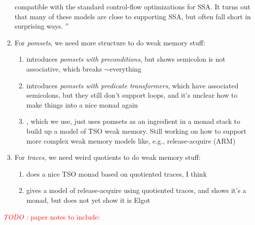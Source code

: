 \documentclass[acmsmall,screen,review]{acmart}
\newcounter{todos}
\newcommand{\TODO}[1]{{
  \stepcounter{todos}
  \begin{center}\large{\textcolor{red}{\emph{TODO \arabic{todos}:} #1}}\end{center}
}}
\begin{document}
\begin{enumerate}
  compatible with the standard control-flow optimizations for SSA. It turns out that many of these
  models are close to supporting SSA, but often fall short in surprising ways. 
  ''
  \item For \emph{pomsets}, we need more structure to do weak memory stuff:
  \begin{enumerate}
    \item \citet{jagadeesan-pwp-20} introduces \emph{pomsets with preconditions}, but
    \citet{leaky-semicolon} shows semicolon is not associative, which breaks $\sim$everything
    \item \citet{leaky-semicolon} introduces \emph{pomsets with predicate transformers}, which have
    associated semicolons, but they still don't support loops, and it's unclear how to make things
    into a nice monad again
    \item \citet{sparky}, which we use, just uses pomsets as an ingredient in a monad stack to build
    up a model of TSO weak memory. Still working on how to support more complex weak
    memory models like, e.g., release-acquire (ARM)
  \end{enumerate}
  \item For \emph{traces}, we need weird quotients to do weak memory stuff:
  \begin{enumerate}
    \item \citet{jagadeesan-brookes-relaxed-12} does a nice TSO monad based on quotiented traces, I
    think
    \item \citet{release-acquire} gives a model of release-acquire using quotiented traces, and
    shows it's a monad, but does not yet show it is Elgot
  \end{enumerate}
\end{enumerate}

\TODO{paper notes to include:}
\end{document}
